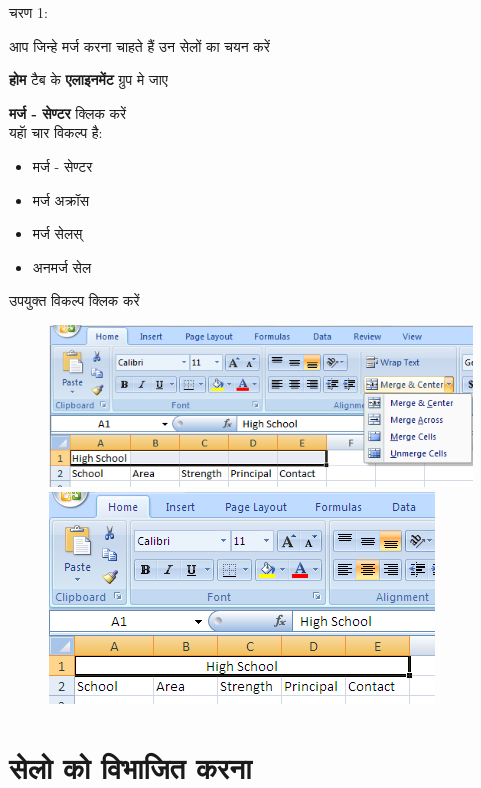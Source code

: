 \begin{descriptionSimple}{चरण 1:}
\item[चरण 1]  आप जिन्हे मर्ज करना चाहते हैं उन सेलों का चयन करें
\item[चरण 2] \textbf{होम} टैब के \textbf{एलाइनमेंट} ग्रुप मे जाए
\item[चरण 3] \textbf{मर्ज - सेण्टर} क्लिक करें\\  यहॅा चार विकल्प है:
		\begin{itemize}[topsep=0.2ex,parsep=0ex,partopsep=0ex,itemsep=0ex]
		\item मर्ज - सेण्टर
		\item मर्ज अक्रॉस
		\item मर्ज सेलस्
		\item अनमर्ज सेल
		\end{itemize}
\item[चरण 4]  उपयुक्त विकल्प क्लिक करें
\end{descriptionSimple}				
\begin{figure}[H]
\centering
\includegraphics[scale=0.37]{src/images/chapter1/chapter1_fig35.png}\qquad
\includegraphics[scale=0.37]{src/images/chapter1/chapter1_fig36.png}
\end{figure}
				
\section{सेलो को विभाजित करना}\label{id-1.18}

